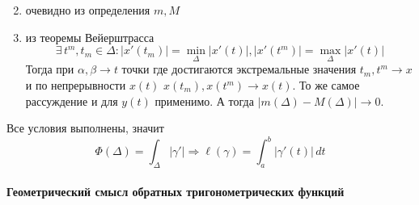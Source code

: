 \documentclass[12pt]{../../notes}
\begin{document}
\begin{ittproof}
\begin{enumerate}
\[      \]
    \item очевидно из определения $m, M$
    \item из теоремы Вейерштрасса 
      \[
        \exists\, t^m , t_m \in \Delta \colon |x'(t_m)| = \min_\Delta |x'(t)|, |x'(t^m)| = \max_\Delta |x'(t)|
      \]
      Тогда при $\alpha,\beta \to t$ точки где достигаются экстремальные значения
      $t_m, t^m \to x$ и по непрерывности $x(t)$ $x(t_m),x(t^m) \to x(t)$.
      То же самое рассуждение и для $y(t)$ применимо. А тогда $|m(\Delta)-M(\Delta)|\to0$.
  \end{enumerate}
  Все условия выполнены, значит
  \[
    \Phi(\Delta) = \int_\Delta |\gamma'| \Rightarrow \ell(\gamma)  = \int_{a}^{b} |\gamma'(t)|\,dt
  \]
\end{ittproof}

\paragraph{Геометрический смысл обратных тригонометрических функций }
\def\arch{\ensuremath \operatorname{arch}}
\end{document}
